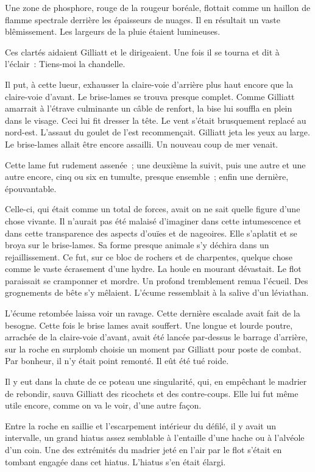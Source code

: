 \documentclass[french,twoside]{book} %
\begin{document}
Une zone de phosphore, rouge de la rougeur boréale, flottait comme un haillon de flamme spectrale derrière les épaisseurs de nuages. Il en résultait un vaste blêmissement. Les largeurs de la pluie étaient lumineuses.\par
Ces clartés aidaient Gilliatt et le dirigeaient. Une fois il se tourna et dit à l’éclair : Tiens-moi la chandelle.\par
Il put, à cette lueur, exhausser la claire-voie d’arrière plus haut encore que la claire-voie d’avant. Le brise-lames se trouva presque complet. Comme Gilliatt amarrait à l’étrave culminante un câble de renfort, la bise lui souffla en plein dans le visage. Ceci lui fit dresser la tête. Le vent s’était brusquement replacé au nord-est. L’assaut du goulet de l’est recommençait. Gilliatt jeta les yeux au large. Le brise-lames allait être encore assailli. Un nouveau coup de mer venait.\par
Cette lame fut rudement assenée ; une deuxième  la suivit, puis une autre et une autre encore, cinq ou six en tumulte, presque ensemble ; enfin une dernière, épouvantable.\par
Celle-ci, qui était comme un total de forces, avait on ne sait quelle figure d’une chose vivante. Il n’aurait pas été malaisé d’imaginer dans cette intumescence et dans cette transparence des aspects d’ouïes et de nageoires. Elle s’aplatit et se broya sur le brise-lames. Sa forme presque animale s’y déchira dans un rejaillissement. Ce fut, sur ce bloc de rochers et de charpentes, quelque chose comme le vaste écrasement d’une hydre. La houle en mourant dévastait. Le flot paraissait se cramponner et mordre. Un profond tremblement remua l’écueil. Des grognements de bête s’y mêlaient. L’écume ressemblait à la salive d’un léviathan.\par
L’écume retombée laissa voir un ravage. Cette dernière escalade avait fait de la besogne. Cette fois le brise lames avait souffert. Une longue et lourde poutre, arrachée de la claire-voie d’avant, avait été lancée par-dessus le barrage d’arrière, sur la roche en surplomb choisie un moment par Gilliatt pour poste de combat. Par bonheur, il n’y était point remonté. Il eût été tué roide.\par
Il y eut dans la chute de ce poteau une singularité, qui, en empêchant le madrier de rebondir, sauva Gilliatt des ricochets et des contre-coups. Elle lui fut même utile encore, comme on va le voir, d’une autre façon.\par
Entre la roche en saillie et l’escarpement intérieur  du défilé, il y avait un intervalle, un grand hiatus assez semblable à l’entaille d’une hache ou à l’alvéole d’un coin. Une des extrémités du madrier jeté en l’air par le flot s’était en tombant engagée dans cet hiatus. L’hiatus s’en était élargi.\par
\end{document}

